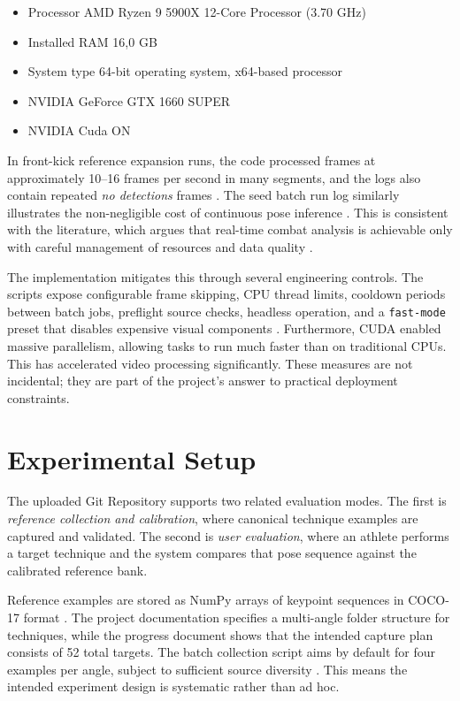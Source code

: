 \documentclass[12pt]{article}
\begin{document}
\begin{itemize}
    \item Processor	AMD Ryzen 9 5900X 12-Core Processor             (3.70 GHz)
    \item Installed RAM	16,0 GB
    \item System type	64-bit operating system, x64-based processor
    \item NVIDIA GeForce GTX 1660 SUPER
    \item NVIDIA Cuda ON
\end{itemize}

In front-kick reference expansion runs, the code processed frames at approximately 10--16 frames per second in many segments, and the logs also contain repeated \textit{no detections} frames \cite{projectFrontKickLog,projectFrontKickStrictLog}. The seed batch run log similarly illustrates the non-negligible cost of continuous pose inference \cite{projectSeedLog}. This is consistent with the literature, which argues that real-time combat analysis is achievable only with careful management of resources and data quality \cite{quinn2024automation,quinn2025yolo}.

The implementation mitigates this through several engineering controls. The scripts expose configurable frame skipping, CPU thread limits, cooldown periods between batch jobs, preflight source checks, headless operation, and a \texttt{fast-mode} preset that disables expensive visual components \cite{projectActionRecognition,projectRunBatch}. Furthermore, CUDA enabled massive parallelism, allowing tasks to run much faster than on traditional CPUs. This has accelerated video processing significantly. 
These measures are not incidental; they are part of the project's answer to practical deployment constraints.


\section{Experimental Setup}
The uploaded Git Repository supports two related evaluation modes. The first is \textit{reference collection and calibration}, where canonical technique examples are captured and validated. The second is \textit{user evaluation}, where an athlete performs a target technique and the system compares that pose sequence against the calibrated reference bank.

Reference examples are stored as NumPy arrays of keypoint sequences in COCO-17 format \cite{projectActionRecognition}. The project documentation specifies a multi-angle folder structure for techniques, while the progress document shows that the intended capture plan consists of 52 total targets. The batch collection script aims by default for four examples per angle, subject to sufficient source diversity \cite{projectRunBatch}. This means the intended experiment design is systematic rather than ad hoc.
\end{document}
